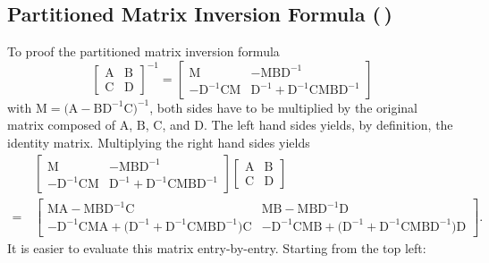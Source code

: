 \documentclass[11pt, a4paper]{scrartcl}
\newcommand{\mat}[1]{\bm{\mathrm{#1}}}
\newcommand{\diffstar}{\texorpdfstring{\raisebox{-1pt}{\resizebox{!}{8pt}{\(\star\)}}}{*}}
\newcommand{\twostar}  {(\diffstar\,\diffstar)}
\begin{document}
		\subsection{Partitioned Matrix Inversion Formula  \twostar}
			To proof the partitioned matrix inversion formula
			\begin{equation}
				\begin{bmatrix}
					\mat{A} & \mat{B} \\
					\mat{C} & \mat{D}
				\end{bmatrix}^{-1}
				=
				\begin{bmatrix}
					\mat{M}                       & -\mat{M} \mat{B} \mat{D}^{-1}                                    \\
					-\mat{D}^{-1} \mat{C} \mat{M} & \mat{D}^{-1} + \mat{D}^{-1} \mat{C} \mat{M} \mat{B} \mat{D}^{-1}
				\end{bmatrix}
			\end{equation}
			with \( \mat{M} = \big( \mat{A} - \mat{B} \mat{D}^{-1} \mat{C} \big)^{-1} \), both sides have to be multiplied by the original matrix composed of \(\mat{A}\), \(\mat{B}\), \(\mat{C}\), and \(\mat{D}\). The left hand sides yields, by definition, the identity matrix. Multiplying the right hand sides yields
			\begin{align}
				&\,
				\begin{bmatrix}
					\mat{M}                       & -\mat{M} \mat{B} \mat{D}^{-1}                                    \\
					-\mat{D}^{-1} \mat{C} \mat{M} & \mat{D}^{-1} + \mat{D}^{-1} \mat{C} \mat{M} \mat{B} \mat{D}^{-1}
				\end{bmatrix}
				\begin{bmatrix}
					\mat{A} & \mat{B} \\
					\mat{C} & \mat{D}
				\end{bmatrix} \\
				=&\,
				\begin{bmatrix}
					\mat{M} \mat{A} - \mat{M} \mat{B} \mat{D}^{-1} \mat{C} & \mat{M} \mat{B} - \mat{M} \mat{B} \mat{D}^{-1} \mat{D} \\
					-\mat{D}^{-1} \mat{C} \mat{M} \mat{A} + \big( \mat{D}^{-1} + \mat{D}^{-1} \mat{C} \mat{M} \mat{B} \mat{D}^{-1} \big) \mat{C} & -\mat{D}^{-1} \mat{C} \mat{M} \mat{B} + \big( \mat{D}^{-1} + \mat{D}^{-1} \mat{C} \mat{M} \mat{B} \mat{D}^{-1} \big) \mat{D}
				\end{bmatrix}\!.
			\end{align}
			It is easier to evaluate this matrix entry-by-entry. Starting from the top left:
\end{document}
